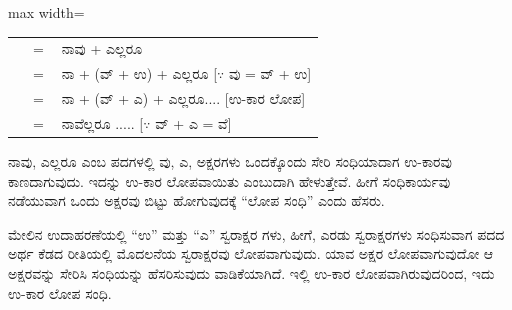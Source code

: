 \begin{kbvderiv}
\vspace{4pt plus 3pt minus 1pt}
\begin{center}\begin{adjustbox}{max width=\textwidth}
{\renewcommand{\arraystretch}{1.22}\setlength{\tabcolsep}{4pt}
\begin{tabular}{l c l}
 & {\color{kbvgrey}$=$} & ನಾವು + ಎಲ್ಲರೂ \\
 & {\color{kbvgrey}$=$} & ನಾ + (ವ್ + ಉ) + ಎಲ್ಲರೂ {[}\ensuremath{\because} ವು = ವ್ + ಉ{]} \\
 & {\color{kbvgrey}$=$} & ನಾ + (ವ್ + ಎ) + ಎಲ್ಲರೂ.... {[}ಉ-ಕಾರ ಲೋಪ{]} \\
 & {\color{kbvgrey}$=$} & ನಾವೆಲ್ಲರೂ ..... {[}\ensuremath{\because} ವ್ + ಎ = ವೆ{]} \\
\end{tabular}}
\end{adjustbox}\end{center}
\vspace{4pt plus 3pt minus 1pt}
\end{kbvderiv}

\indent ನಾವು, ಎಲ್ಲರೂ ಎಂಬ ಪದಗಳಲ್ಲಿ ವು, ಎ, ಅಕ್ಷರಗಳು ಒಂದಕ್ಕೊಂದು ಸೇರಿ ಸಂಧಿಯಾದಾಗ ಉ-ಕಾರವು ಕಾಣದಾಗುವುದು. ಇದನ್ನು ಉ-ಕಾರ ಲೋಪವಾಯಿತು ಎಂಬುದಾಗಿ ಹೇಳುತ್ತೇವೆ. ಹೀಗೆ ಸಂಧಿಕಾರ್ಯವು ನಡೆಯುವಾಗ ಒಂದು ಅಕ್ಷರವು ಬಿಟ್ಟು ಹೋಗುವುದಕ್ಕೆ “ಲೋಪ ಸಂಧಿ” ಎಂದು ಹೆಸರು.\par

\begin{kbvnote}
\hspace{0.5em}ಮೇಲಿನ ಉದಾಹರಣೆಯಲ್ಲಿ “ಉ” ಮತ್ತು “ಎ” ಸ್ವರಾಕ್ಷರ ಗಳು, ಹೀಗೆ, ಎರಡು ಸ್ವರಾಕ್ಷರಗಳು ಸಂಧಿಸುವಾಗ ಪದದ ಅರ್ಥ ಕೆಡದ ರೀತಿಯಲ್ಲಿ ಮೊದಲನೆಯ ಸ್ವರಾಕ್ಷರವು ಲೋಪವಾಗುವುದು. ಯಾವ ಅಕ್ಷರ ಲೋಪವಾಗುವುದೋ ಆ ಅಕ್ಷರವನ್ನು ಸೇರಿಸಿ ಸಂಧಿಯನ್ನು ಹೆಸರಿಸುವುದು ವಾಡಿಕೆಯಾಗಿದೆ. ಇಲ್ಲಿ ಉ-ಕಾರ ಲೋಪವಾಗಿರುವುದರಿಂದ, ಇದು ಉ-ಕಾರ ಲೋಪ ಸಂಧಿ.
\end{kbvnote}

\vspace{3pt plus 2pt}\noindent\hspace*{1.2em}\par\vspace{1pt}

